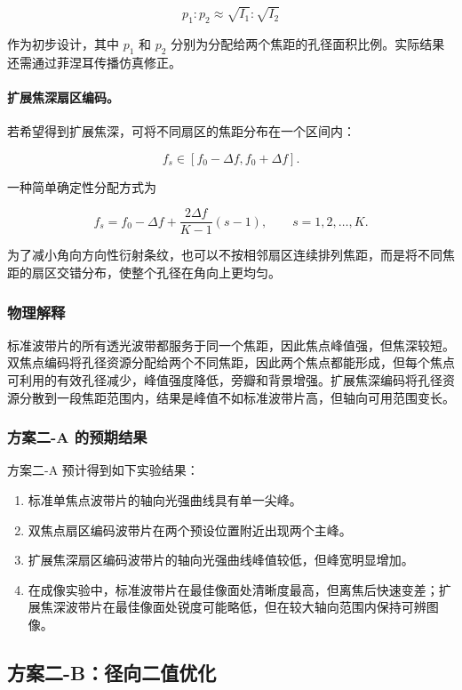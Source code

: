 \documentclass[UTF8,a4paper,11pt]{ctexart}
\begin{document}
\[
p_1:p_2\approx \sqrt{I_1}:\sqrt{I_2}
\]

作为初步设计，其中 $p_1$ 和 $p_2$ 分别为分配给两个焦距的孔径面积比例。实际结果还需通过菲涅耳传播仿真修正。

\paragraph{扩展焦深扇区编码。}
若希望得到扩展焦深，可将不同扇区的焦距分布在一个区间内：

\[
f_s \in [f_0-\Delta f, f_0+\Delta f].
\]

一种简单确定性分配方式为

\[
f_s=f_0-\Delta f+
\frac{2\Delta f}{K-1}(s-1),
\qquad s=1,2,\ldots,K.
\]

为了减小角向方向性衍射条纹，也可以不按相邻扇区连续排列焦距，而是将不同焦距的扇区交错分布，使整个孔径在角向上更均匀。

\subsubsection{物理解释}

标准波带片的所有透光波带都服务于同一个焦距，因此焦点峰值强，但焦深较短。双焦点编码将孔径资源分配给两个不同焦距，因此两个焦点都能形成，但每个焦点可利用的有效孔径减少，峰值强度降低，旁瓣和背景增强。扩展焦深编码将孔径资源分散到一段焦距范围内，结果是峰值不如标准波带片高，但轴向可用范围变长。

\subsubsection{方案二-A 的预期结果}

方案二-A 预计得到如下实验结果：

\begin{enumerate}[label=(\arabic*)]
\item 标准单焦点波带片的轴向光强曲线具有单一尖峰。
\item 双焦点扇区编码波带片在两个预设位置附近出现两个主峰。
\item 扩展焦深扇区编码波带片的轴向光强曲线峰值较低，但峰宽明显增加。
\item 在成像实验中，标准波带片在最佳像面处清晰度最高，但离焦后快速变差；扩展焦深波带片在最佳像面处锐度可能略低，但在较大轴向范围内保持可辨图像。
\end{enumerate}

\subsection{方案二-B：径向二值优化}
\label{sec:binary}
\end{document}
